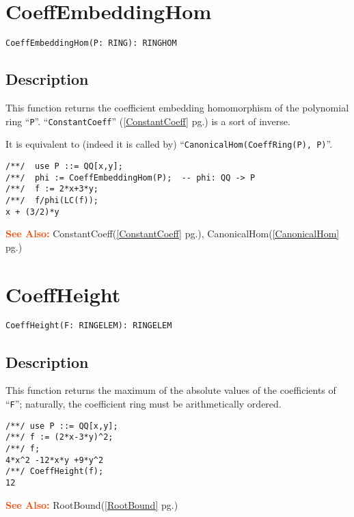 \documentclass[a4paper]{mybook}
\newenvironment{command}{}{} %
\newcommand\SeeAlso{\par\textcolor{OrangeRed}{\textbf{\large See Also: }}}
\begin{document}
\section{CoeffEmbeddingHom}
\label{CoeffEmbeddingHom}
\begin{command} %


\begin{Verbatim}[label=syntax, rulecolor=\color{MidnightBlue},
frame=single]
CoeffEmbeddingHom(P: RING): RINGHOM
\end{Verbatim}


\subsection*{Description}

This function returns the coefficient embedding homomorphism of the
polynomial ring ``\verb&P&''.  ``\verb&ConstantCoeff&'' (\ref{ConstantCoeff} pg.\pageref{ConstantCoeff}) is a sort of inverse.
\par 
It is equivalent to (indeed it is called by) ``\verb&CanonicalHom(CoeffRing(P), P)&''.
\begin{Verbatim}[label=example, rulecolor=\color{PineGreen}, frame=single]
/**/  use P ::= QQ[x,y];
/**/  phi := CoeffEmbeddingHom(P);  -- phi: QQ -> P
/**/  f := 2*x+3*y;
/**/  f/phi(LC(f));
x + (3/2)*y
\end{Verbatim}


\SeeAlso %
  ConstantCoeff(\ref{ConstantCoeff} pg.\pageref{ConstantCoeff}), 
    CanonicalHom(\ref{CanonicalHom} pg.\pageref{CanonicalHom})
\end{command} %

\section{CoeffHeight}
\label{CoeffHeight}
\begin{command} %


\begin{Verbatim}[label=syntax, rulecolor=\color{MidnightBlue},
frame=single]
CoeffHeight(F: RINGELEM): RINGELEM
\end{Verbatim}


\subsection*{Description}

This function returns the maximum of the absolute values of the
coefficients of ``\verb&F&''; naturally, the coefficient ring must be
arithmetically ordered.
\begin{Verbatim}[label=example, rulecolor=\color{PineGreen}, frame=single]
/**/ use P ::= QQ[x,y];
/**/ f := (2*x-3*y)^2;
/**/ f;
4*x^2 -12*x*y +9*y^2
/**/ CoeffHeight(f);
12
\end{Verbatim}


\SeeAlso %
  RootBound(\ref{RootBound} pg.\pageref{RootBound})
\end{command} %
\end{document}
